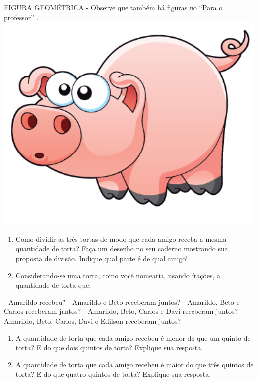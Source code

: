 \documentclass[a4,12pt]{book}
\begin{document}
\begin{imagem*}[breakable]{}{}    FIGURA GEOMÉTRICA - Observe que também há figuras no   ``Para o professor''  .
    \includegraphics[width=420pt, keepaspectratio]{pig}
\end{imagem*}

\begin{enumerate} [\quad a)] %
  \item     Como dividir as três tortas de modo que cada amigo receba a mesma quantidade de torta? Faça um desenho no seu caderno mostrando sua proposta de divisão. Indique qual parte é de qual amigo!
  \item     Considerando-se uma torta, como você nomearia, usando frações, a quantidade de torta que:
\end{enumerate} %

        - Amarildo recebeu?
        - Amarildo e Beto receberam juntos?
        - Amarildo, Beto e Carlos receberam juntos?
        - Amarildo, Beto, Carlos e Davi receberam juntos?
        - Amarildo, Beto, Carlos, Davi e Edilson receberam juntos?
\begin{enumerate} [\quad a)] %
  \item     A quantidade de torta que cada amigo recebeu é menor do que um quinto de torta? E do que dois quintos de torta? Explique sua resposta.
  \item     A quantidade de torta que cada amigo recebeu é maior do que três quintos de torta? E do que quatro quintos de torta? Explique sua resposta.
\end{enumerate} %
\end{document}
